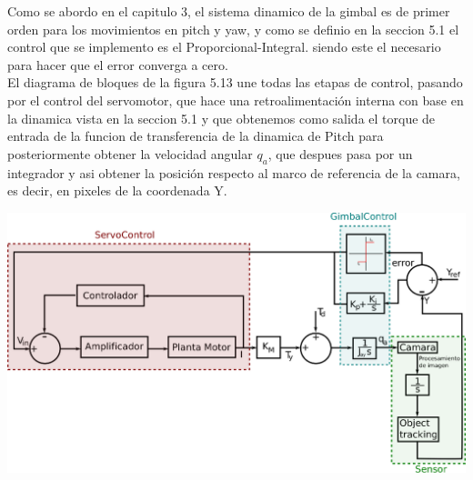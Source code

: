 Como se abordo en el capitulo 3, el sistema dinamico de la gimbal es de primer orden para los movimientos en pitch y yaw, y como se definio en la seccion 5.1
el control que se implemento es el Proporcional-Integral. siendo este el necesario para hacer que el error converga a cero.\\
El diagrama de bloques de la figura 5.13 une todas las etapas de control, pasando por el control del servomotor, que hace una retroalimentación interna con base
en la dinamica vista en la seccion 5.1 y que obtenemos como salida el torque de entrada de la funcion de transferencia de la dinamica de Pitch para posteriormente
obtener la velocidad angular $q_a$, que despues pasa por un integrador y asi obtener la posición respecto al marco de referencia de la camara, es decir, en 
pixeles de la coordenada Y.
\begin{center}
	\includegraphics[width=1.0\textwidth]{Contenido/Cuerpo/Capitulo5/Fig22.eps}
	\label{Fig4}
\end{center}


